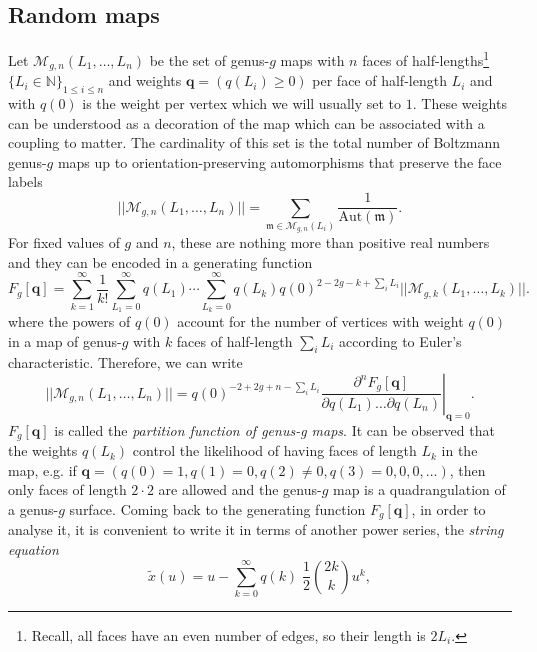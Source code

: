 \documentclass[a4paper,11pt]{article}
\begin{document}
\subsection{Random maps}
Let $\mathcal{M}_{g,n}(L_1,\dots,L_n)$ be the set of genus-$g$ maps with $n$ faces of half-lengths\footnote{Recall, all faces have an even number of edges, so their length is $2L_i$.} $\{L_i\in \mathbb{N}\}_{1\leq i\leq n}$ and weights $\mathbf{q}=(q(L_i)\geq 0)$ per face of half-length $L_i$ and with $q(0)$ is the weight per vertex which we will usually set to $1$. These weights can be understood as a decoration of the map which can be associated with a coupling to matter. The cardinality of this set is the total number of Boltzmann genus-$g$ maps up to orientation-preserving automorphisms that preserve the face labels
\begin{equation}
    ||\mathcal{M}_{g,n}(L_1,\dots,L_n)||=\sum_{\mathfrak{m}\in\mathcal{M}_{g,n}({L_i})}\frac{1}{\mathrm{Aut}(\mathfrak{m})}.
\end{equation}
For fixed values of $g$ and $n$, these are nothing more than positive real numbers and they can be encoded in a generating function
\begin{equation}
  F_g[\mathbf{q}]= \sum_{k=1}^\infty\frac{1}{k!} \sum_{L_1=0}^\infty q(L_1) \cdots \sum_{L_k=0}^\infty q(L_k) q(0)^{2-2g-k+\sum_i L_i} ||\mathcal{M}_{g,k}(L_1,\dots,L_k)||.
\end{equation}
where the powers of $q(0)$ account for the number of vertices with weight $q(0)$ in a map of genus-$g$ with $k$ faces of half-length $\sum_i L_i$ according to Euler's characteristic. Therefore, we can write  
\begin{equation}
     ||\mathcal{M}_{g,n}(L_1,\dots,L_n)||=q(0)^{-2+2g+n-\sum_i L_i}\left.\frac{\partial^n F_g[\mathbf{q}]}{\partial q(L_1)\dots \partial q(L_n)}\right|_{\mathbf{q}=0}.
\end{equation}
$F_g[\mathbf{q}]$ is called the \textit{partition function of genus-g maps}. It can be observed that the weights $q(L_k)$ control the likelihood of having faces of length $L_k$ in the map, e.g. if $\mathbf{q}=(q(0)=1,q(1)=0,q(2)\neq 0,q(3)=0,0,0,\dots)$, then only faces of length $2\cdot2$ are allowed and the genus-$g$ map is a quadrangulation of a genus-$g$ surface. Coming back to the generating function $F_g[\mathbf{q}]$, in order to analyse it, it is convenient to write it in terms of another power series, the \textit{string equation} 
\begin{equation}
   \tilde{x}(u)=u-\sum_{k=0}^\infty q(k)\;\frac{1}{2}\binom{2k}{k} u^k,\label{eq:string_eq_maps}
\end{equation}
\end{document}
